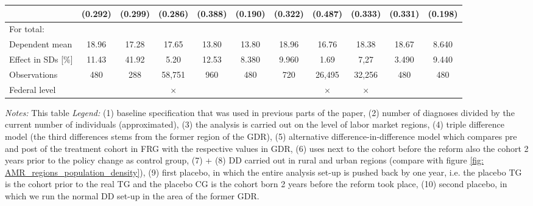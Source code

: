 \begin{landscape}
\begin{table}[htbp]
\begin{threeparttable}
{\begin{tabular}{l*{10}{c}}
										&	(0.292)			&	(0.299)			&   (0.286)     	&	(0.388)			& 	(0.190)			& (0.322)			&	(0.487)		&	(0.333)				&	 (0.331) 		&	(0.198)		\\
					\midrule            																																																						
					For total: 																																																				\\							 
					Dependent mean 		&   18.96			&	17.28			&   17.65     		&	13.80			& 	13.80			& 18.96				&	16.76		&	18.38				&	18.67			&	8.640		\\
					Effect in SDs [\%] 	&   11.43			&	41.92			&   5.20      		&	12.53			& 	8.380			& 9.960				&	1.69		&	7,27				&	3.490			&	9.440		\\
					Observations 		&   480				&	288				&   58,751    		&	960				& 	480				& 720				&	26,495		&	32,256				&	480				&	480			\\
					Federal level		&   \checkmark		&	\checkmark		&   $\times$		& \checkmark		&	\checkmark		& \checkmark		&	$\times$	&	$\times$			&	\checkmark		&  \checkmark	\\ 
					\bottomrule
			\end{tabular}}
	\end{threeparttable} 
		\begin{minipage}{0.87\linewidth}
		\scriptsize \emph{Notes:} This table %
		\newline \emph{Legend:} (1) baseline specification that was used in previous parts of the paper, (2) number of diagnoses divided by the current number of individuals (approximated), (3) the analysis is carried out on the level of labor market regions, (4) triple difference model (the third differences stems from the former region of the GDR), (5) alternative difference-in-difference model which compares pre and post of the treatment cohort in FRG with the respective values in GDR, (6) uses next to the cohort before the reform also the cohort 2 years prior to the policy change as control group, (7) + (8)  DD carried out in rural and urban regions (compare with figure \ref{fig: AMR_regions_population_density}), (9) first placebo, in which the entire analysis set-up is pushed back by one year, i.e. the placebo TG is the cohort prior to the real TG and the placebo CG is the cohort born 2 years before the reform took place, (10) second placebo, in which we run the normal DD set-up in the area of the former GDR. \newline

\end{minipage}
\end{table}
\end{landscape}
